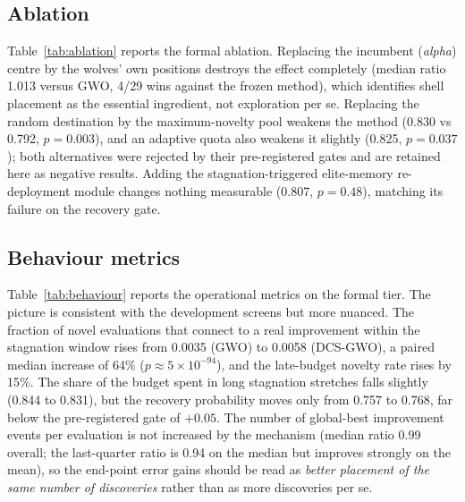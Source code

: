 \documentclass[journal]{IEEEtran}
\newcommand{\method}{DCS-GWO}
\begin{document}
\subsection{Ablation}
\label{sec:ablation}
Table~\ref{tab:ablation} reports the formal ablation. Replacing the
incumbent (\emph{alpha}) centre by the wolves' own positions destroys the
effect completely (median ratio 1.013 versus GWO, 4/29 wins against the
frozen method), which identifies shell placement as the essential
ingredient, not exploration per se. Replacing the random destination by the
maximum-novelty pool weakens the method (0.830 vs 0.792, $p=0.003$), and an
adaptive quota also weakens it slightly (0.825, $p=0.037$); both alternatives
were rejected by their pre-registered gates and are retained here as
negative results. Adding the stagnation-triggered elite-memory
re-deployment module changes nothing measurable (0.807, $p=0.48$), matching
its failure on the recovery gate.

\begin{table}[t]
\centering
\caption{Formal ablation (same protocol as Table~\ref{tab:main}); ``vs
final'' is the paired comparison against \method{}.}
\label{tab:ablation}

\end{table}

\subsection{Behaviour metrics}
Table~\ref{tab:behaviour} reports the operational metrics on the formal
tier. The picture is consistent with the development screens but more
nuanced. The fraction of novel evaluations that connect to a real
improvement within the stagnation window rises from 0.0035 (GWO) to 0.0058
(\method{}), a paired median increase of 64\% ($p\approx5\times10^{-94}$),
and the late-budget novelty rate rises by 15\%. The share of the budget
spent in long stagnation stretches falls slightly (0.844 to 0.831), but the
recovery probability moves only from 0.757 to 0.768, far below the
pre-registered gate of $+0.05$. The number of global-best improvement events
per evaluation is not increased by the mechanism (median ratio 0.99
overall; the last-quarter ratio is 0.94 on the median but improves strongly
on the mean), so the end-point error gains should be read as \emph{better
placement of the same number of discoveries} rather than as more discoveries
per se.

\begin{table}[t]
\centering
\caption{Behaviour metrics on the formal tier (\method{} variants and GWO;
audited baselines do not carry the probe record).}
\label{tab:behaviour}

\end{table}
\end{document}
